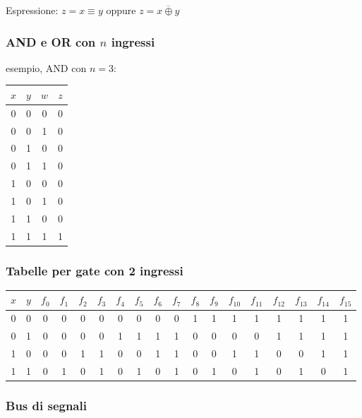 \documentclass{article}
\begin{document}
\noindent
Espressione: $z = x \equiv y$ oppure $z = \overline{x \oplus y}$

\subsubsection{AND e OR con $n$ ingressi}

esempio, AND con $n=3$:

\begin{center}
\begin{tabular}{ |c|c|c|c| }
\hline
$x$ & $y$ & $w$ & $z$ \\
\hline
\hline
0 & 0 & 0 & 0 \\
0 & 0 & 1 & 0 \\
0 & 1 & 0 & 0 \\
0 & 1 & 1 & 0 \\
1 & 0 & 0 & 0 \\
1 & 0 & 1 & 0 \\
1 & 1 & 0 & 0 \\
1 & 1 & 1 & 1 \\
\hline
\end{tabular}
\end{center}

\subsubsection{Tabelle per gate con 2 ingressi}

\begin{center}
\begin{tabular}{ |c|c|c|c|c|c|c|c|c|c|c|c|c|c|c|c|c|c| }
\hline
$x$ & $y$ & $f_0$ & $f_1$ & $f_2$ & $f_3$ & $f_4$ & $f_5$ & $f_6$ & $f_7$ & $f_8$ & $f_9$ & $f_{10}$ & $f_{11}$ & $f_{12}$ & $f_{13}$ & $f_{14}$ & $f_{15}$ \\
\hline
\hline
0 & 0 & 0 & 0 & 0 & 0 & 0 & 0 & 0 & 0 & 1 & 1 & 1 & 1 & 1 & 1 & 1 & 1 \\
0 & 1 & 0 & 0 & 0 & 0 & 1 & 1 & 1 & 1 & 0 & 0 & 0 & 0 & 1 & 1 & 1 & 1 \\
1 & 0 & 0 & 0 & 1 & 1 & 0 & 0 & 1 & 1 & 0 & 0 & 1 & 1 & 0 & 0 & 1 & 1 \\
1 & 1 & 0 & 1 & 0 & 1 & 0 & 1 & 0 & 1 & 0 & 1 & 0 & 1 & 0 & 1 & 0 & 1 \\
\hline
\end{tabular}
\end{center}

\subsubsection{Bus di segnali}
\end{document}
